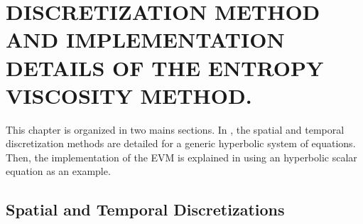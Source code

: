 %
%
%

\chapter{\uppercase {Discretization method and implementation details of the entropy viscosity method.}}\label{chap:disc_chap2}
This chapter is organized in two mains sections. In , the spatial and temporal discretization methods are detailed for a generic hyperbolic system of equations. Then, the implementation of the EVM is explained in  using an hyperbolic scalar equation as an example. 

\section{Spatial and Temporal Discretizations}\label{sec:disc_sect2}
%
